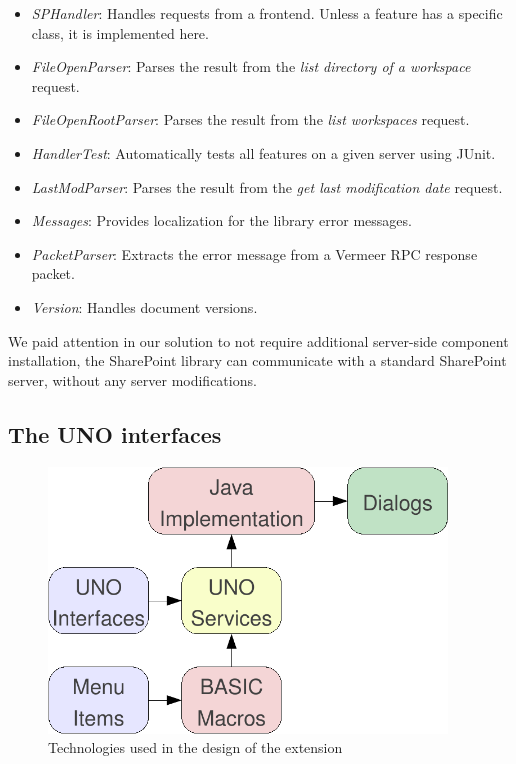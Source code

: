 \begin{itemize}
\item \emph{SPHandler}: Handles requests from a frontend. Unless a feature has a
specific class, it is implemented here.
\item \emph{FileOpenParser}: Parses the result from the \emph{list directory of
a workspace} request.
\item \emph{FileOpenRootParser}: Parses the result from the \emph{list
workspaces} request.
\item \emph{HandlerTest}: Automatically tests all features on a given server
using JUnit.
\item \emph{LastModParser}: Parses the result from the \emph{get last
modification date} request.
\item \emph{Messages}: Provides localization for the library error messages.
\item \emph{PacketParser}: Extracts the error message from a Vermeer
RPC\cite{vermeer} response packet.
\item \emph{Version}: Handles document versions.
\end{itemize}

We paid attention in our solution to not require additional server-side component
installation, the SharePoint library can communicate with a standard SharePoint
server, without any server modifications.

\subsection{The UNO interfaces}

\begin{figure}[H]
\centering
\includegraphics[width=400px,keepaspectratio]{design-technologies.pdf}
\caption{Technologies used in the design of the extension}
\label{fig:design-technologies}
\end{figure}

